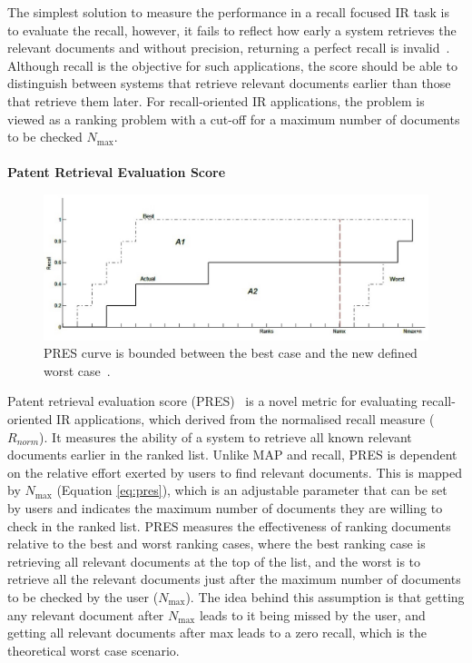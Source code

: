The simplest solution to measure the performance in a recall focused IR task is to evaluate the recall, however, it fails to reflect how early a system retrieves the relevant documents and without precision, returning a perfect recall is invalid~\citep{Suominen08t.:critical}. Although recall is the objective for such applications, the score should be able to distinguish between systems that retrieve relevant documents earlier than those that retrieve them later. For recall-oriented IR applications, the problem is viewed as a ranking problem with a cut-off for a maximum number of documents to be checked $ N_{\max} $.\\\\
\textbf{Patent Retrieval Evaluation Score}
\ \\
\begin{figure}[t!]
   \centering
   \includegraphics[scale=.37]{figs/pres.jpg}
   \caption{PRES curve is bounded between the best case and the new defined worst case~\citep{magdy2010pres}.}  
   \label{fig:pres} 
\end{figure}
Patent retrieval evaluation score (PRES)~\citep{magdy2010pres} is a novel metric for evaluating recall-oriented IR applications, which derived from the normalised recall measure ($ R_{norm} $). It measures the ability of a system to retrieve all known relevant documents earlier in the ranked list. Unlike MAP and recall, PRES is dependent on the relative effort exerted by users to find relevant documents. This is mapped by $ N_{\max} $ (Equation \ref{eq:pres}), which is an adjustable parameter that can be set by users and indicates the maximum number of documents they are willing to check in the ranked list. PRES measures the effectiveness of ranking documents relative to the best and worst ranking cases, where the best ranking case is retrieving all relevant documents at the top of the list, and the worst is to retrieve all the relevant documents just after the maximum number of documents to
be checked by the user ($ N_{\max} $). The idea behind this assumption is that getting any relevant document after $ N_{\max} $ leads to it being missed by the user, and getting all relevant documents after max leads to a zero recall, which is the theoretical worst case scenario. 
